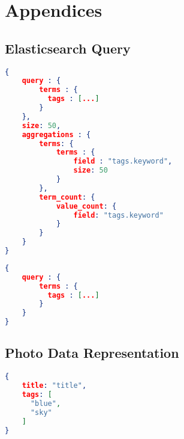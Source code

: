 \chapter{Appendices}

\section{Elasticsearch Query}
\begin{lstlisting}[language=json, caption={Initial query to retrive query expansion data}]
{
    query : {
        terms : {
          tags : [...]
        }
    },
    size: 50,
    aggregations : {
        terms: {
            terms : {
                field : "tags.keyword",
                size: 50
            }
        },
        term_count: {
            value_count: {
                field: "tags.keyword"
            }
        }
    }
}
\end{lstlisting}

\begin{lstlisting}[language=json, caption={Search for photos with query expanded terms}]
{
    query : {
        terms : {
          tags : [...]
        }
    }
}
\end{lstlisting}

\section{Photo Data Representation}
\begin{lstlisting}[language={json}, caption={Internal photo data representation in elasticsearch}]
{
    title: "title",
    tags: [
      "blue",
      "sky"
    ]
}
\end{lstlisting}
